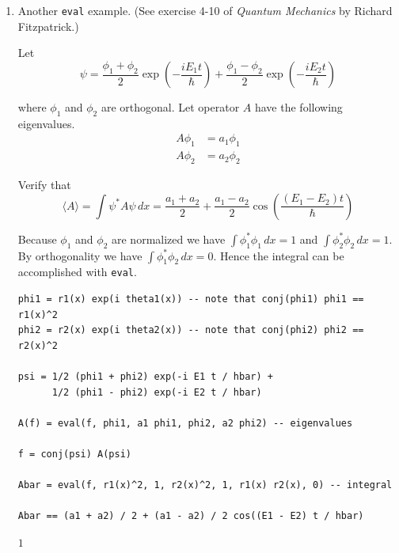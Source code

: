 \begin{enumerate}
{\begin{verbatim}
EXP = exp(-m omega x^2 / hbar)
ERF = erf(sqrt(m omega / hbar) x)

eval(F, EXP, 0, ERF, 1) - eval(F, EXP, 0, ERF, -1)
\end{verbatim}}

$1$

\newpage

\item
Another \verb$eval$ example.
(See exercise 4-10 of {\it Quantum Mechanics} by Richard Fitzpatrick.)

\bigskip
Let
\begin{equation*}
\psi
=\frac{\phi_1+\phi_2}{2}\exp\left(-\frac{iE_1t}{\hbar}\right)
+\frac{\phi_1-\phi_2}{2}\exp\left(-\frac{iE_2t}{\hbar}\right)
\end{equation*}

where $\phi_1$ and $\phi_2$ are orthogonal.
Let operator $A$ have the following eigenvalues.
\begin{align*}
A\phi_1&=a_1\phi_1
\\
A\phi_2&=a_2\phi_2
\end{align*}

Verify that
\begin{equation*}
\langle A\rangle
=\int\psi^*A\psi\,dx
=\frac{a_1+a_2}{2}+\frac{a_1-a_2}{2}\cos\left(\frac{(E_1-E_2)t}{\hbar}\right)
\end{equation*}

Because $\phi_1$ and $\phi_2$ are normalized we have
$\int\phi_1^*\phi_1\,dx=1$ and $\int\phi_2^*\phi_2\,dx=1$.
By orthogonality we have $\int\phi_1^*\phi_2\,dx=0$.
Hence the integral can be accomplished with \verb$eval$.

{\color{blue}
\begin{verbatim}
phi1 = r1(x) exp(i theta1(x)) -- note that conj(phi1) phi1 == r1(x)^2
phi2 = r2(x) exp(i theta2(x)) -- note that conj(phi2) phi2 == r2(x)^2

psi = 1/2 (phi1 + phi2) exp(-i E1 t / hbar) +
      1/2 (phi1 - phi2) exp(-i E2 t / hbar)

A(f) = eval(f, phi1, a1 phi1, phi2, a2 phi2) -- eigenvalues

f = conj(psi) A(psi)

Abar = eval(f, r1(x)^2, 1, r2(x)^2, 1, r1(x) r2(x), 0) -- integral

Abar == (a1 + a2) / 2 + (a1 - a2) / 2 cos((E1 - E2) t / hbar)
\end{verbatim}}

$1$

\end{enumerate}

